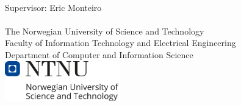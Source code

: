 \clearpage
\begin{titlepage}
    \noindent {\large \bf \thesisAuthor}
    \vspace{1.5cm}
    
    \noindent \raggedright {\Huge \thesisTitle}
    \vspace{1.5cm}
    \noindent {\Large \it \thesisSubTitle}
    \vspace{4cm}
    
    
    
    \vfill
    \noindent \thesisType \\
    Supervisor: Eric Monteiro \\
    \thesisDate \\[0.2cm]
    \noindent The Norwegian University of Science and Technology\\ Faculty of Information Technology and Electrical Engineering\\ Department of Computer and Information Science\\ [2cm]
    \includegraphics[width=5cm]{fig/ntnu_logo_text.png}
\end{titlepage}
\cleardoublepage
%
%
%
%
%
